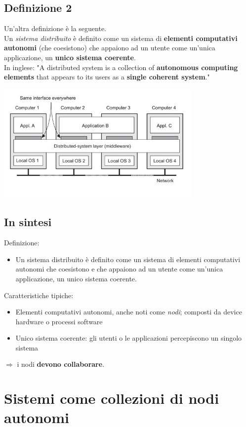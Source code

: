 \subsection{Definizione 2}
Un'altra definizione è la seguente.
\\Un \textit{sistema distribuito} è definito come un sistema di \textbf{elementi computativi autonomi} (che coesistono) che appaiono ad un utente come un'unica applicazione, un \textbf{unico sistema coerente}.
\\In inglese: "A distributed system is a collection of \textbf{autonomous computing elements} that appears to its users as a \textbf{single coherent system}."
\begin{center}
    \includegraphics[width=0.75\textwidth]{img/lez28022023_def2.jpg}
\end{center}

\subsection{In sintesi}
Definizione:
\begin{itemize}
    \item Un sistema distribuito è definito come un sistema di elementi computativi autonomi che coesistono e che appaiono ad un utente come un'unica applicazione, un unico sistema coerente.
\end{itemize}
Caratteristiche tipiche:
\begin{itemize}
   \item Elementi computativi autonomi, anche noti come \textit{nodi}; composti da device hardware o processi software
   \item Unico sistema coerente: gli utenti o le applicazioni percepiscono un singolo sistema
\end{itemize}
$\Rightarrow$ i nodi \textbf{devono collaborare}.

\section{Sistemi come collezioni di nodi autonomi}

